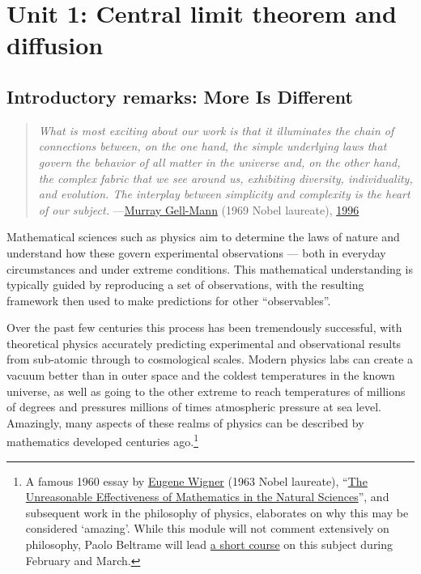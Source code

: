 \renewcommand{\thisunit}{MATH327 Unit 1}
\renewcommand{\moddate}{Last modified 23 Jan.~2025}
\setcounter{section}{1}
\setcounter{subsection}{0}
{}
\section*{Unit 1: Central limit theorem and diffusion}
\subsection*{Introductory remarks: More Is Different}
\begin{quote}
  \textit{What is most exciting about our work is that it illuminates the chain of connections between, on the one hand, the simple underlying laws that govern the behavior of all matter in the universe and, on the other hand, the complex fabric that we see around us, exhibiting diversity, individuality, and evolution. The interplay between simplicity and complexity is the heart of our subject.} \hfill ---\href{https://en.wikipedia.org/wiki/Murray_Gell-Mann}{Murray Gell-Mann} (1969 Nobel laureate), \href{https://doi.org/10.1002/cplx.6130010502}{1996}
\end{quote}

Mathematical sciences such as physics aim to determine the laws of nature and understand how these govern experimental observations --- both in everyday circumstances and under extreme conditions.
This mathematical understanding is typically guided by reproducing a set of observations, with the resulting framework then used to make predictions for other ``observables''.

Over the past few centuries this process has been tremendously successful, with theoretical physics accurately predicting experimental and observational results from sub-atomic through to cosmological scales.
Modern physics labs can create a vacuum better than in outer space and the coldest temperatures in the known universe, as well as going to the other extreme to reach temperatures of millions of degrees and pressures millions of times atmospheric pressure at sea level.
Amazingly, many aspects of these realms of physics can be described by mathematics developed centuries ago.\footnote{A famous 1960 essay by \href{https://en.wikipedia.org/wiki/Eugene_Wigner}{Eugene Wigner} (1963 Nobel laureate), ``\href{https://en.wikipedia.org/wiki/The_Unreasonable_Effectiveness_of_Mathematics_in_the_Natural_Sciences}{The Unreasonable Effectiveness of Mathematics in the Natural Sciences}'', and subsequent work in the philosophy of physics, elaborates on why this may be considered `amazing'.  While this module will not comment extensively on philosophy, Paolo Beltrame will lead \href{https://indico.ph.liv.ac.uk/event/1846/}{a short course} on this subject during February and March.}

